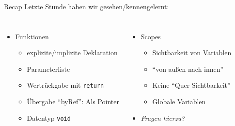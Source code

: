 
\begin{frame}[fragile]{Recap}
%
Letzte Stunde haben wir gesehen/kennengelernt:
%
\begin{columns}[T]
\begin{itemize}
\item Funktionen
	\begin{itemize}
	\item explizite/implizite Deklaration
	\item Parameterliste
	\item Wertrückgabe mit \texttt{return}
	\item Übergabe \enquote{byRef}: Als Pointer
	\item Datentyp \texttt{void}
	\end{itemize}
\end{itemize}
%
\begin{itemize}
\item Scopes
	\begin{itemize}
	\item Sichtbarkeit von Variablen
	\item \enquote{von außen nach innen}
	\item Keine \enquote{Quer-Sichtbarkeit}
	\item Globale Variablen
	\end{itemize}
\item \emph{Fragen hierzu?}
\end{itemize}
\end{columns}
%
\end{frame}


